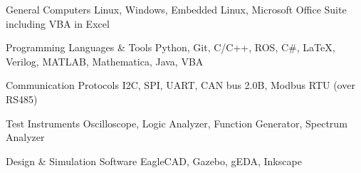 

\begin{cvskills}

  \cvskill
    {General Computers} %
    {Linux, Windows, Embedded Linux, Microsoft Office Suite including VBA in Excel} %

  \cvskill
    {Programming Languages \& Tools} %
    {Python, Git, C/C++, ROS, C\#, LaTeX, Verilog, MATLAB, Mathematica, Java, VBA} %

  \cvskill
    {Communication Protocols} %
    {I2C, SPI, UART, CAN bus 2.0B, Modbus RTU (over RS485)} %

  \cvskill
    {Test Instruments} %
    {Oscilloscope, Logic Analyzer, Function Generator, Spectrum Analyzer} %

  \cvskill
    {Design \& Simulation Software} %
    {EagleCAD, Gazebo, gEDA, Inkscape} %

\end{cvskills}
